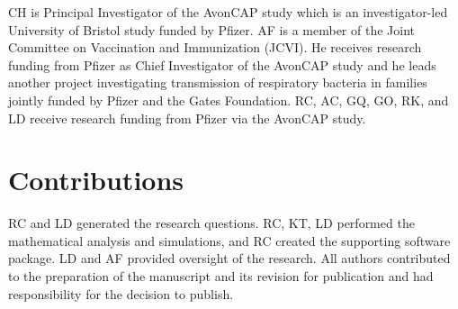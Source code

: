 \documentclass[10pt,letterpaper]{article}
\begin{document}
CH is Principal Investigator of the AvonCAP study which is an investigator-led University of Bristol study funded by Pfizer. AF is a member of the Joint Committee on Vaccination and Immunization (JCVI). He receives research funding from Pfizer as Chief Investigator of the AvonCAP study and he leads another project investigating transmission of respiratory bacteria in families jointly funded by Pfizer and the Gates Foundation. RC, AC, GQ, GO, RK, and LD receive research funding from Pfizer via the AvonCAP study.

\section*{Contributions}

RC and LD generated the research questions. RC, KT, LD performed the mathematical analysis and simulations, and RC created the supporting software package. LD and AF provided oversight of the research. All authors contributed to the preparation of the manuscript and its revision for publication and had responsibility for the decision to publish.

\nolinenumbers


\end{document}
